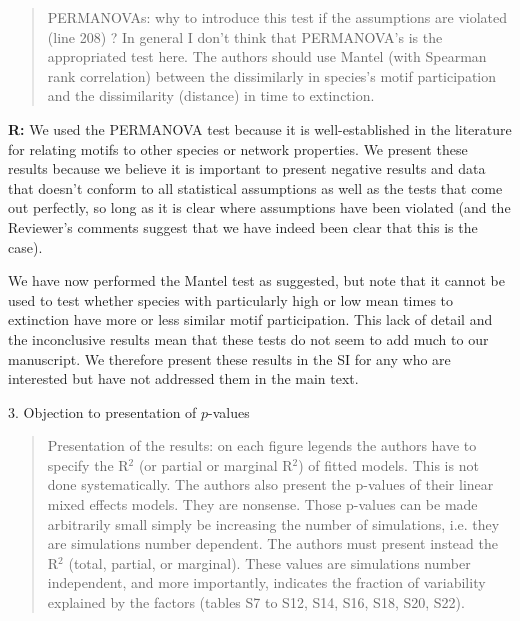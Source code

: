 \documentclass[12pt]{article}
\begin{document}
      \begin{quotation}
        PERMANOVAs: why to introduce this test if the assumptions are violated (line 208) ? In general I don't think that PERMANOVA's is the appropriated test here. The authors should use Mantel (with Spearman rank correlation) between the dissimilarly in species's motif participation and the dissimilarity (distance) in time to extinction.
      \end{quotation}

      \smallskip

      \textbf{R:} We used the PERMANOVA test because it is well-established in the literature for relating motifs to other species or network properties. 
      We present these results because we believe it is important to present negative results and data that doesn't conform to all statistical assumptions as well as the tests that come out perfectly, so long as it is clear where assumptions have been violated (and the Reviewer's comments suggest that we have indeed been clear that this is the case). 

      We have now performed the Mantel test as suggested, but note that it cannot be used to test whether species with particularly high or low mean times to extinction have more or less similar motif participation. 
      This lack of detail and the inconclusive results mean that these tests do not seem to add much to our manuscript. 
      We therefore present these results in the SI for any who are interested but have not addressed them in the main text.

    \smallskip

    3. Objection to presentation of $p$-values

      \begin{quotation}
        Presentation of the results: on each figure legends the authors have to specify the R$^2$ (or partial  or marginal R$^2$) of fitted models. This is not done systematically. The authors also present the p-values of their linear mixed effects models. They are nonsense. Those p-values can be made arbitrarily small simply be increasing the number of simulations, i.e. they are simulations number dependent. The authors must present instead the R$^2$ (total, partial, or marginal). These values are simulations number independent, and more importantly, indicates the fraction of variability explained by the factors (tables S7 to S12, S14, S16, S18, S20, S22).
      \end{quotation}

      \smallskip
\end{document}
